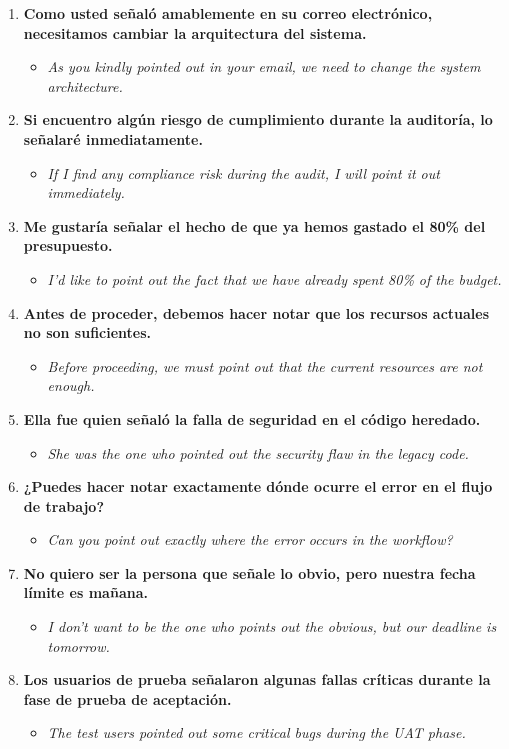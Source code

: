 \documentclass[
10pt, %
a4paper, %
oneside, %
headinclude,footinclude, %
BCOR5mm, %
]{scrartcl}
\begin{document}
\begin{enumerate}
	\item \textbf{Como usted señaló amablemente en su correo electrónico, necesitamos cambiar la arquitectura del sistema.}
	\begin{itemize}
		\item \textit{As you kindly pointed out in your email, we need to change the system architecture.}
	\end{itemize}
	\item \textbf{Si encuentro algún riesgo de cumplimiento durante la auditoría, lo señalaré inmediatamente.}
	\begin{itemize}
		\item \textit{If I find any compliance risk during the audit, I will point it out immediately.}
	\end{itemize}
	\item \textbf{Me gustaría señalar el hecho de que ya hemos gastado el 80\% del presupuesto.}
	\begin{itemize}
		\item \textit{I'd like to point out the fact that we have already spent 80\% of the budget.}
	\end{itemize}
	\item \textbf{Antes de proceder, debemos hacer notar que los recursos actuales no son suficientes.}
	\begin{itemize}
		\item \textit{Before proceeding, we must point out that the current resources are not enough.}
	\end{itemize}
	\item \textbf{Ella fue quien señaló la falla de seguridad en el código heredado.}
	\begin{itemize}
		\item \textit{She was the one who pointed out the security flaw in the legacy code.}
	\end{itemize}
	\item \textbf{¿Puedes hacer notar exactamente dónde ocurre el error en el flujo de trabajo?}
	\begin{itemize}
		\item \textit{Can you point out exactly where the error occurs in the workflow?}
	\end{itemize}
	\item \textbf{No quiero ser la persona que señale lo obvio, pero nuestra fecha límite es mañana.}
	\begin{itemize}
		\item \textit{I don't want to be the one who points out the obvious, but our deadline is tomorrow.}
	\end{itemize}
	\item \textbf{Los usuarios de prueba señalaron algunas fallas críticas durante la fase de prueba de aceptación.}
	\begin{itemize}
		\item \textit{The test users pointed out some critical bugs during the UAT phase.}
	\end{itemize}
\end{enumerate}
\end{document}
